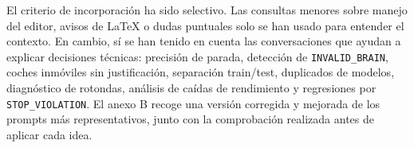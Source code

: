 El criterio de incorporación ha sido selectivo. Las consultas menores sobre manejo del editor, avisos de LaTeX o dudas puntuales solo se han usado para entender el contexto. En cambio, sí se han tenido en cuenta las conversaciones que ayudan a explicar decisiones técnicas: precisión de parada, detección de \texttt{INVALID\_BRAIN}, coches inmóviles sin justificación, separación train/test, duplicados de modelos, diagnóstico de rotondas, análisis de caídas de rendimiento y regresiones por \texttt{STOP\_VIOLATION}. El anexo B recoge una versión corregida y mejorada de los prompts más representativos, junto con la comprobación realizada antes de aplicar cada idea.
